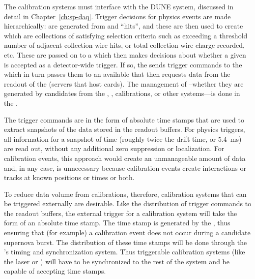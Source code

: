 
The calibration systems must interface with the DUNE  system, discussed in detail in Chapter~\ref{ch:sp-daq}. 
Trigger decisions for physics events are made %
hierarchically:  are generated from  and  ``hits'', and these  are then used to create  which are collections of  satisfying selection criteria such as exceeding a threshold number of adjacent collection wire hits, or total collection wire charge recorded, etc. These  are passed on to a  which then makes decisions about whether a given  is accepted as a detector-wide trigger.  If so, the  sends trigger commands to the  which in turn passes them to an available  that then requests data from the  readout of the  (servers that host  cards). The management of --whether they are generated by candidates from the , , calibrations, or other systems---is done in the . 

The trigger commands are in the form of absolute time stamps that are used to extract snapshots of the data stored in the  readout buffers. For physics triggers, all  information for a snapshot of time (roughly twice the drift time, or \SI{5.4}{\milli\s}) are read out, without any additional zero suppression or localization. For calibration events, this approach would create an unmanageable amount of data and, in any case, is unnecessary because calibration events create interactions or tracks at known positions or times or both.


    
    To reduce data volume from calibrations, therefore, calibration systems that can be triggered externally are desirable. Like the distribution of trigger commands to the  readout buffers, the external trigger for a calibration system will take the form of an absolute time stamp. The time stamp is generated by the , thus ensuring that (for example) a calibration event does not occur during a candidate supernova burst.  The distribution of these time stamps will be done through the 's timing and synchronization system. Thus triggerable calibration systems (like the laser or ) will have to be synchronized to the rest of the  system and be capable of accepting time stamps.

